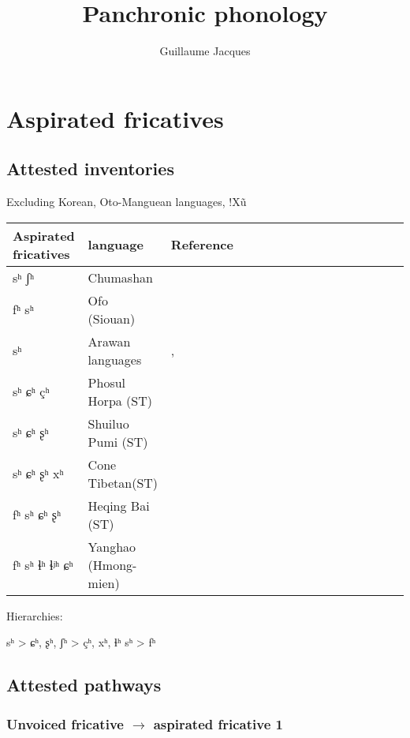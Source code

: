 \documentclass[oldfontcommands,oneside,a4paper,11pt]{article}
\begin{document}
 
\linenumbers
\title{Panchronic phonology}
\author{Guillaume Jacques}
\maketitle
\section{Aspirated fricatives}
\citet{jacques11lingua}

\subsection{Attested inventories}
 
Excluding Korean, Oto-Manguean languages, !Xũ
\begin{table}[H] \centering
\begin{tabular}{llllllllllllllll}
\toprule
Aspirated fricatives & language & Reference\\
\midrule
sʰ ʃʰ & Chumashan &\citet{klar77chumashan}\\
fʰ sʰ& Ofo (Siouan)& \citet{reuse81ofo} \\
sʰ & Arawan languages  &\citet{dixon04arawa},
\citet{dienst05kulina}\\
sʰ ɕʰ çʰ & Phosul Horpa (ST)&\citet{jackson00puxi} \\
sʰ ɕʰ ʂʰ & Shuiluo Pumi (ST)&\citet{jacques11lingua} \\
sʰ ɕʰ ʂʰ xʰ & Cone Tibetan(ST) &\citet{jacques11lingua} \\
fʰ sʰ ɕʰ ʂʰ   & Heqing Bai (ST) &\citet{wang06songqi} \\
fʰ sʰ ɬʰ ɬʲʰ ɕʰ   & Yanghao (Hmong-mien) &\citet{ratliff10protohm}\\
\bottomrule
\end{tabular}

Hierarchies:

\begin{exe}
\ex 
\glt sʰ > {ɕʰ, ʂʰ, ʃʰ} > {çʰ, xʰ, ɬʰ}
\glt sʰ > fʰ
\end{exe}
\end{table}



\subsection{Attested pathways}
 

\subsubsection{Unvoiced  fricative $\rightarrow$ aspirated fricative 1}
\end{document}
